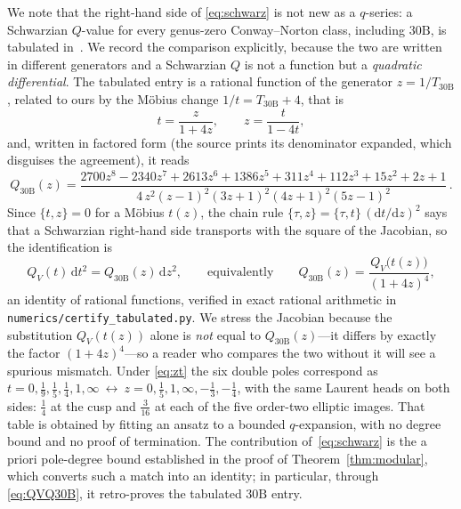 \documentclass[cntp]{ipart}
\newcommand{\rmd}{\mathrm{d}}
\theoremstyle{plain}
\theoremstyle{remark}
\begin{document}
We note that the right-hand side of \eqref{eq:schwarz} is not new as a $q$-series: a Schwarzian
$Q$-value for every genus-zero Conway--Norton class, including $30\mathrm{B}$, is tabulated
in~\cite{LianWiczer2006}. We record the comparison explicitly, because the two are written in
different generators and a Schwarzian $Q$ is not a function but a \emph{quadratic differential}.
The tabulated entry is a rational function of the generator $z=1/T_{30\mathrm{B}}$, related to ours
by the M\"obius change $1/t=T_{30\mathrm{B}}+4$, that is
\begin{equation}
t=\frac{z}{1+4z},\qquad z=\frac{t}{1-4t},
\label{eq:zt}
\end{equation}
and, written in factored form (the source prints its denominator expanded, which disguises the
agreement), it reads
\begin{equation}
Q_{30\mathrm{B}}(z)=\frac{2700z^8-2340z^7+2613z^6+1386z^5+311z^4+112z^3+15z^2+2z+1}
{4\,z^2(z-1)^2(3z+1)^2(4z+1)^2(5z-1)^2}\,.
\label{eq:Q30B}
\end{equation}
Since $\{t,z\}=0$ for a M\"obius $t(z)$, the chain rule $\{\tau,z\}=\{\tau,t\}\,(\rmd t/\rmd z)^2$
says that a Schwarzian right-hand side transports with the square of the Jacobian, so the
identification is
\begin{equation}
Q_V(t)\,\rmd t^2=Q_{30\mathrm{B}}(z)\,\rmd z^2,
\qquad\text{equivalently}\qquad
Q_{30\mathrm{B}}(z)=\frac{Q_V\big(t(z)\big)}{(1+4z)^4},
\label{eq:QVQ30B}
\end{equation}
an identity of rational functions, verified in exact rational arithmetic in
\texttt{numerics/\allowbreak certify\_\allowbreak tabulated.py}. We stress the Jacobian because the
substitution $Q_V(t(z))$ alone is \emph{not} equal to $Q_{30\mathrm{B}}(z)$---it differs by exactly
the factor $(1+4z)^4$---so a reader who compares the two without it will see a spurious mismatch.
Under \eqref{eq:zt} the six double poles correspond as
$t=0,\tfrac19,\tfrac15,\tfrac14,1,\infty\ \leftrightarrow\ z=0,\tfrac15,1,\infty,-\tfrac13,-\tfrac14$,
with the same Laurent heads on both sides: $\tfrac14$ at the cusp and $\tfrac3{16}$ at each of the
five order-two elliptic images. That table is obtained by fitting an ansatz to a bounded
$q$-expansion, with no degree bound and no proof of termination. The contribution
of~\eqref{eq:schwarz} is the a priori pole-degree bound established in the proof of
Theorem~\ref{thm:modular}, which converts such a match into an identity; in particular, through
\eqref{eq:QVQ30B}, it retro-proves the tabulated $30\mathrm{B}$ entry.
\end{document}
